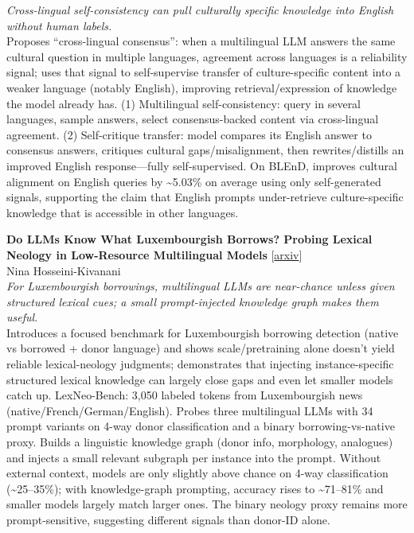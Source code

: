 \documentclass[12pt,letterpaper]{article}
\begin{document}
{\small\textit{Cross-lingual self-consistency can pull culturally specific knowledge into English without human labels.}}\\[1pt]
{\footnotesize Proposes ``cross-lingual consensus'': when a multilingual LLM answers the same cultural question in multiple languages, agreement across languages is a reliability signal; uses that signal to self-supervise transfer of culture-specific content into a weaker language (notably English), improving retrieval/expression of knowledge the model already has. (1) Multilingual self-consistency: query in several languages, sample answers, select consensus-backed content via cross-lingual agreement. (2) Self-critique transfer: model compares its English answer to consensus answers, critiques cultural gaps/misalignment, then rewrites/distills an improved English response---fully self-supervised. On BLEnD, improves cultural alignment on English queries by \textasciitilde{}5.03\% on average using only self-generated signals, supporting the claim that English prompts under-retrieve culture-specific knowledge that is accessible in other languages.}

\medskip

{\small\textbf{Do LLMs Know What Luxembourgish Borrows? Probing Lexical Neology in Low-Resource Multilingual Models}} {\scriptsize[\href{https://arxiv.org/abs/2605.21227}{arxiv}]}\\
{\scriptsize Nina Hosseini-Kivanani}\\

{\small\textit{For Luxembourgish borrowings, multilingual LLMs are near-chance unless given structured lexical cues; a small prompt-injected knowledge graph makes them useful.}}\\[1pt]
{\footnotesize Introduces a focused benchmark for Luxembourgish borrowing detection (native vs borrowed + donor language) and shows scale/pretraining alone doesn't yield reliable lexical-neology judgments; demonstrates that injecting instance-specific structured lexical knowledge can largely close gaps and even let smaller models catch up. LexNeo-Bench: 3,050 labeled tokens from Luxembourgish news (native/French/German/English). Probes three multilingual LLMs with 34 prompt variants on 4-way donor classification and a binary borrowing-vs-native proxy. Builds a linguistic knowledge graph (donor info, morphology, analogues) and injects a small relevant subgraph per instance into the prompt. Without external context, models are only slightly above chance on 4-way classification (\textasciitilde{}25--35\%); with knowledge-graph prompting, accuracy rises to \textasciitilde{}71--81\% and smaller models largely match larger ones. The binary neology proxy remains more prompt-sensitive, suggesting different signals than donor-ID alone.}
\end{document}
